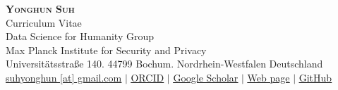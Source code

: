 \documentclass[letterpaper,MMMyyyy,nonstopmode]{simpleresumecv}
\newcommand{\CVWebpage}{https://yonghuni.github.io/blog/about/me/}
\newcommand{\CVGithub}{https://github.com/YONGHUNI}
\newcommand{\CVOrcid}{https://orcid.org/0009-0003-6800-2731}
\begin{document}

\begin{center}
    \textbf{\Huge \scshape Yonghun Suh} \\ \vspace{7pt}
    Curriculum Vitae \\ \vspace{3pt}
    Data Science for Humanity Group \\  \vspace{3pt}
    \small{Max Planck Institute for Security and Privacy} \\  \vspace{3pt}
    \small{Universitätsstraße 140. 44799 Bochum. Nordrhein-Westfalen Deutschland} \\  \vspace{3pt}
    \small \href{mailto:suhyonghun@gmail.com}{\underline{suhyonghun [at] gmail.com}} $|$
    \href{\CVOrcid}{\underline{ORCID}}
    $|$
    \href{https://scholar.google.com/citations?user=Le1ODbgAAAAJ}{\underline{Google Scholar}}
    $|$
    \href{\CVWebpage}{\underline{Web page}}
    $|$ \href{\CVGithub}{\underline{GitHub}}

\end{center}
\end{document}
